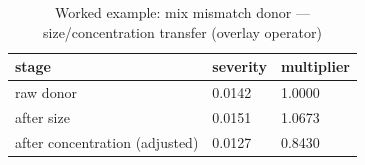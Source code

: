 \begin{table}[htbp]
\centering
\caption{Worked example: mix mismatch donor --- size/concentration transfer (overlay operator)}
\label{tab:v1_we_mix_mismatch}
\begin{tabular}{lll}
\toprule
\textbf{stage} & \textbf{severity} & \textbf{multiplier} \\
\midrule
raw donor & 0.0142 & 1.0000 \\
after size & 0.0151 & 1.0673 \\
after concentration (adjusted) & 0.0127 & 0.8430 \\
\bottomrule
\end{tabular}
\end{table}
